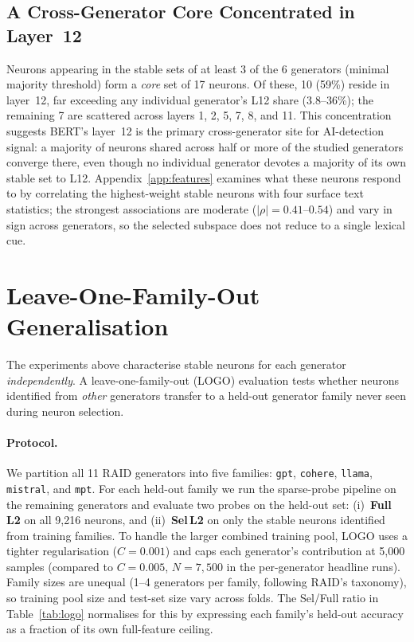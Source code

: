 \documentclass[11pt]{article}
\begin{document}
\subsection{A Cross-Generator Core Concentrated in Layer~12}
\label{sec:crossgen-core}

Neurons appearing in the stable sets of at least 3 of the 6 generators (minimal majority threshold) form a \textit{core} set of 17 neurons. Of these, 10 (59\%) reside in layer~12, far exceeding any individual generator's L12 share (3.8--36\%); the remaining 7 are scattered across layers 1, 2, 5, 7, 8, and 11. This concentration suggests BERT's layer~12 is the primary cross-generator site for AI-detection signal: a majority of neurons shared across half or more of the studied generators converge there, even though no individual generator devotes a majority of its own stable set to L12. Appendix~\ref{app:features} examines what these neurons respond to by correlating the highest-weight stable neurons with four surface text statistics; the strongest associations are moderate ($|\rho| = 0.41$--$0.54$) and vary in sign across generators, so the selected subspace does not reduce to a single lexical cue.

\section{Leave-One-Family-Out Generalisation}
\label{sec:logo}

The experiments above characterise stable neurons for each generator
\emph{independently}. A leave-one-family-out (LOGO) evaluation tests
whether neurons identified from \textit{other} generators transfer to a
held-out generator family never seen during neuron selection.

\paragraph{Protocol.}
We partition all 11 RAID generators into five families: \texttt{gpt}, \texttt{cohere}, \texttt{llama}, \texttt{mistral}, and \texttt{mpt}. For each held-out family we run the sparse-probe pipeline on the remaining generators and evaluate two probes on the held-out set: (i)~\textbf{Full L2} on all 9{,}216 neurons, and (ii)~\textbf{Sel\,L2} on only the stable neurons identified from training families. To handle the larger combined training pool, LOGO uses a tighter regularisation ($C = 0.001$) and caps each generator's contribution at 5{,}000 samples (compared to $C = 0.005$, $N = 7{,}500$ in the per-generator headline runs). Family sizes are unequal (1--4 generators per family, following RAID's taxonomy), so training pool size and test-set size vary across folds. The Sel/Full ratio in Table~\ref{tab:logo} normalises for this by expressing each family's held-out accuracy as a fraction of its own full-feature ceiling.
\end{document}
